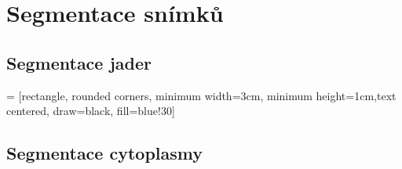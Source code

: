 \chapter{Segmentace snímků}

\section{Segmentace jader}

 = [rectangle, rounded corners, minimum width=3cm, minimum height=1cm,text centered, draw=black, fill=blue!30]


\section{Segmentace cytoplasmy}
